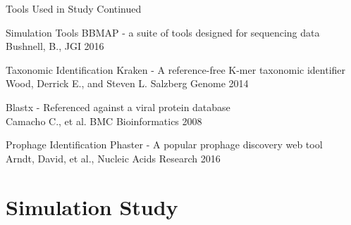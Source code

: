 \documentclass[11pt]{beamer}
\begin{document}
	\begin{frame}{Tools Used in Study Continued}
	\begin{block}{Simulation Tools}
	BBMAP - a suite of tools designed for sequencing data \\
	\tiny{Bushnell, B., JGI 2016}
	\end{block}
	
	\begin{block}{Taxonomic Identification}
	Kraken - A reference-free K-mer taxonomic identifier \\
	\tiny{Wood, Derrick E., and Steven L. Salzberg Genome 2014}
	
	\large{Blastx - Referenced against a viral protein database} \\
	\tiny{Camacho C., et al. BMC Bioinformatics 2008}
	\end{block}
	
	\begin{block}{Prophage Identification}
	Phaster - A popular prophage discovery web tool  \\
	\tiny{Arndt, David, et al., Nucleic Acids Research 2016}
	\end{block}
	\end{frame}
	
	
\section{Simulation Study}
\subsection{}
	
\end{document}
